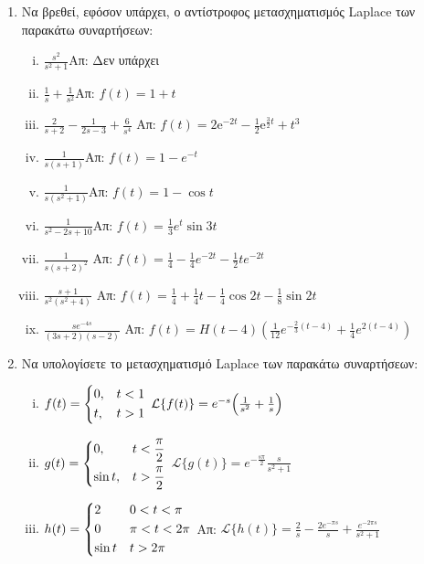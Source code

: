\begin{enumerate}
  \item Να βρεθεί, εφόσον υπάρχει, ο αντίστροφος μετασχηματισμός Laplace των 
    παρακάτω συναρτήσεων:
    \begin{enumerate}[i)]
      \item $\frac{s^2}{s^2+1}$\hfill Απ: Δεν υπάρχει
      \item $\frac{1}{s}+\frac{1}{s^2}$\hfill Απ: $f(t)=1+t$
      \item $ \frac{2}{s+2} - \frac{1}{2s-3} + \frac{6}{s^{4}} $ 
        \hfill Απ: $ f(t) = 2 \mathrm{e}^{-2t}-\frac{1}{2} \mathrm{e}^{\frac{3}{2} t} +
        t^{3}$  
      \item $\frac{1}{s(s+1)}$\hfill Απ: $f(t)=1-e^{-t}$
      \item $\frac{1}{s(s^2+1)}$\hfill Απ: $f(t)=1-\cos t$
      \item $\frac{1}{s^2-2s+10}$\hfill Απ: $f(t)=\frac{1}{3}e^t\sin 3t$
      \item $\frac{1}{s(s+2)^2}$
        \hfill Απ: $f(t)=\frac{1}{4}-\frac{1}{4}e^{-2t}-\frac{1}{2}te^{-2t}$
      \item $\frac{s+1}{s^{2}(s^{2}+4)}$ 
        \hfill Απ: $f(t)=\frac{1}{4}+\frac{1}{4}t-\frac{1}{4}\cos 2t -\frac{1}{8}\sin 2t$
      \item $\frac{se^{-4s}}{(3s+2)(s-2)}$ 
        \hfill Απ: $f(t)=H(t-4)\left(\frac{1}{12}e^{-\frac{2}{3}(t-4)}+
        \frac{1}{4}e^{2(t-4)}\right)$
    \end{enumerate}

  \item Να υπολογίσετε το μετασχηματισμό Laplace των παρακάτω συναρτήσεων:
    \begin{enumerate}[i)]
      \item $f(t)=
        \begin{dcases} 
          0, & t<1 \\ t, & t>1 
        \end{dcases}$ 
        \hfill $\mathcal{L}\{f(t)\}=e^{-s}\Bigl(\frac{1}{s^2}+\frac{1}{s}\Bigr)$

      \item $g(t)=
        \begin{dcases} 
          0, & t<\frac{\pi}{2} \\ \sin t, & t>\frac{\pi}{2}
        \end{dcases}$ 
        \hfill $\mathcal{L}\{g(t)\}=e^{-\frac{s\pi}{2}}\frac{s}{s^2+1}$

      \item $h(t)=
        \begin{dcases} 
          2 & 0 < t<\pi \\ 0 & \pi <t < 2\pi \\ \sin{t} & t > 2\pi
        \end{dcases}$ 
        \hfill Απ: $\mathcal{L}\{h(t)\}=\frac{2}{s}-\frac{2e^{-\pi s}}{s}+
        \frac{e^{-2\pi s}}{s^{2}+1}$


\end{enumerate}
\end{enumerate}
